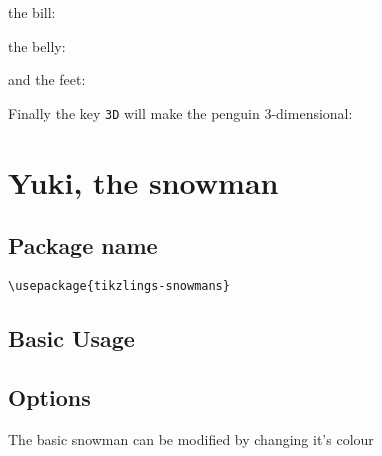 \documentclass[parskip=half]{scrartcl}
\begin{document}
the bill:

\begin{tcblisting}{}
\penguin[bill=red]
\end{tcblisting}

the belly:

\begin{tcblisting}{}
\penguin[belly=red]
\end{tcblisting}

and the feet:

\begin{tcblisting}{}
\penguin[feet=red]
\end{tcblisting}

Finally the key \lstinline|3D| will make the penguin 3-dimensional:

\begin{tcblisting}{}
\penguin[3D]
\end{tcblisting}



\clearpage
\section[\textbackslash snowman]{Yuki, the snowman}

\subsection{Package name}

\begin{tcolorbox}[lower separated=false, lefthand width=.8\linewidth]
\vspace*{0.5cm}
\lstinline|\usepackage{tikzlings-snowmans}|
\vspace*{0.5cm}
\end{tcolorbox}

\subsection{Basic Usage}

\begin{tcblisting}{}
\snowman
\end{tcblisting}

\subsection{Options}

The basic snowman can be modified by changing it's colour
\end{document}
